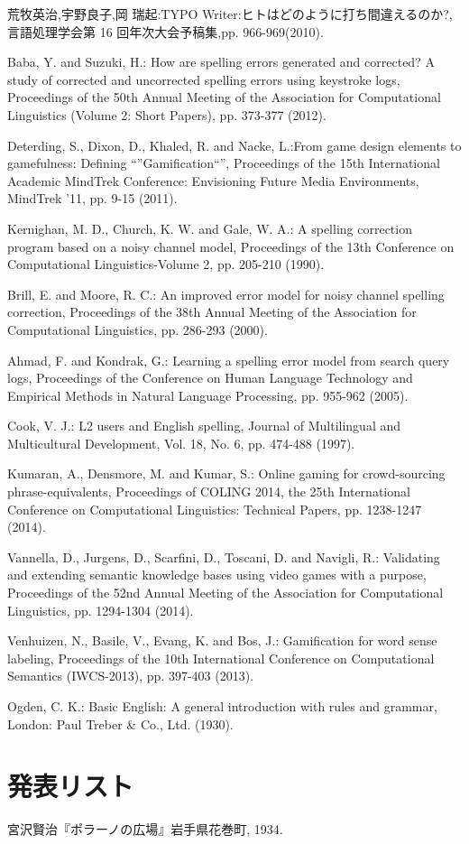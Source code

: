  \begin{thebibliography}{99}
	 荒牧英治,宇野良子,岡 瑞起:TYPO Writer:ヒトはどのように打ち間違えるのか?,言語処理学会第 16 回年次大会予稿集,pp. 966-969(2010).
	
	 Baba, Y. and Suzuki, H.: How are spelling errors generated and corrected? A study of corrected and uncorrected spelling errors using keystroke logs, Proceedings of the 50th Annual Meeting of the Association for Computational Linguistics (Volume 2: Short Papers), pp. 373-377 (2012).

	 Deterding, S., Dixon, D., Khaled, R. and Nacke, L.:From game design elements to gamefulness: Defining “”Gamification“”, Proceedings of the 15th International Academic MindTrek Conference: Envisioning Future Media Environments, MindTrek ’11, pp. 9-15 (2011).

	 Kernighan, M. D., Church, K. W. and Gale, W. A.: A spelling correction program based on a noisy channel model, Proceedings of the 13th Conference on Computational Linguistics-Volume 2, pp. 205-210 (1990).

	 Brill, E. and Moore, R. C.: An improved error model for noisy channel spelling correction, Proceedings of the 38th Annual Meeting of the Association for Computational Linguistics, pp. 286-293 (2000).

	 Ahmad, F. and Kondrak, G.: Learning a spelling error model from search query logs, Proceedings of the Conference on Human Language Technology and Empirical Methods in Natural Language Processing, pp. 955-962 (2005).

	 Cook, V. J.: L2 users and English spelling, Journal of Multilingual and Multicultural Development, Vol. 18, No. 6, pp. 474-488 (1997).

	 Kumaran, A., Densmore, M. and Kumar, S.: Online gaming for crowd-sourcing phrase-equivalents, Proceedings of COLING 2014, the 25th International Conference on Computational Linguistics: Technical Papers, pp. 1238-1247 (2014).

	 Vannella, D., Jurgens, D., Scarfini, D., Toscani, D. and Navigli, R.: Validating and extending semantic knowledge bases using video games with a purpose, Proceedings of the 52nd Annual Meeting of the Association for Computational Linguistics, pp. 1294-1304 (2014).

	 Venhuizen, N., Basile, V., Evang, K. and Bos, J.: Gamification for word sense labeling, Proceedings of the 10th International Conference on Computational Semantics (IWCS-2013), pp. 397-403 (2013).

	 Ogden, C. K.: Basic English: A general introduction with rules and grammar, London: Paul Treber \& Co., Ltd. (1930).


 \end{thebibliography}


 \newpage

 \section*{\Large 発表リスト}
 \noindent [NL223] 宮沢賢治『ポラーノの広場』岩手県花巻町, 1934.